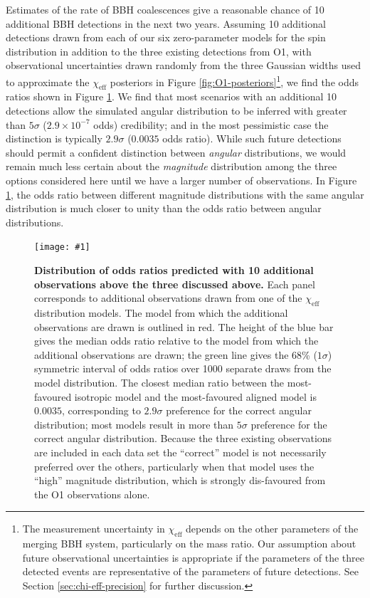 \documentclass{nature}
\newcommand{\chieff}{\chi_\mathrm{eff}}
\newcommand{\OTwoSigmaIsoAlignedMin}{2.9}
\newcommand{\OTwoOddsIsoAlignedMin}{0.0035}
\newcommand{\plotone}[1]{\texttt{[image: \#1]}}
\begin{document}
Estimates of the rate of \ac{BBH} coalescences give a reasonable
chance of 10 additional \ac{BBH} detections in the next two
years\cite{O1-BBH,2016ApJ...833L...1A,2016ApJS..227...14A}.  Assuming
10 additional detections drawn from each of our six zero-parameter
models for the spin distribution in addition to the three existing
detections from O1, with observational uncertainties drawn randomly
from the three Gaussian widths used to approximate the $\chieff$
posteriors in Figure \ref{fig:O1-posteriors}\footnote{The measurement
  uncertainty in $\chieff$ depends on the other parameters of the
  merging \ac{BBH} system, particularly on the mass ratio.  Our
  assumption about future observational uncertainties is appropriate
  if the parameters of the three detected events are representative of
  the parameters of future detections. See Section
  \ref{sec:chi-eff-precision} for further discussion.}, we find the
odds ratios shown in Figure \ref{fig:O2-predictions}.  We find that
most scenarios with an additional 10 detections allow the simulated
angular distribution to be inferred with greater than $5\sigma$
($2.9 \times 10^{-7}$ odds) credibility; and in the most pessimistic
case the distinction is typically $\OTwoSigmaIsoAlignedMin\sigma$
($\OTwoOddsIsoAlignedMin$ odds ratio).  While such future detections
should permit a confident distinction between \emph{angular}
distributions, we would remain much less certain about the
\emph{magnitude} distribution among the three options considered here
until we have a larger number of
observations\cite{2017arXiv170306869F,2017arXiv170306223G}.  In Figure
\ref{fig:O2-predictions}, the odds ratio between different magnitude
distributions with the same angular distribution is much closer to
unity than the odds ratio between angular distributions.

\begin{figure}
  \plotone{../plots/six-way-O2-model-selection}
  \caption{\label{fig:O2-predictions} \textbf{Distribution of odds
      ratios predicted with 10 additional observations above the three
      discussed above.}  Each panel corresponds to additional
    observations drawn from one of the $\chieff$ distribution models.
    The model from which the additional observations are drawn is
    outlined in red.  The height of the blue bar gives the median odds
    ratio relative to the model from which the additional observations
    are drawn; the green line gives the 68\% ($1 \sigma$) symmetric
    interval of odds ratios over 1000 separate draws from the model
    distribution.  The closest median ratio between the most-favoured
    isotropic model and the most-favoured aligned model is
    $\OTwoOddsIsoAlignedMin$, corresponding to
    $\OTwoSigmaIsoAlignedMin\sigma$ preference for the correct angular
    distribution; most models result in more than $5\sigma$ preference
    for the correct angular distribution.  Because the three existing
    observations are included in each data set the ``correct'' model
    is not necessarily preferred over the others, particularly when
    that model uses the ``high'' magnitude distribution, which is
    strongly dis-favoured from the O1 observations alone.}
\end{figure}
\end{document}
